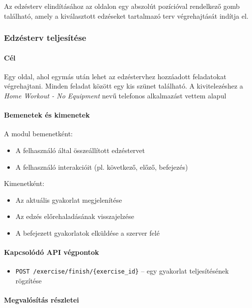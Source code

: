 \documentclass[
]{thesis-ekf}
\theoremstyle{definition}
\theoremstyle{remark}
\begin{document}
Az edzésterv elindításához az oldalon egy abszolút pozícióval rendelkező gomb található, amely a kiválasztott edzéseket tartalmazó terv végrehajtását indítja el.

\subsubsection{Edzésterv teljesítése}

\paragraph{Cél}
Egy oldal, ahol egymás után lehet az edzéstervhez hozzáadott feladatokat végrehajtani. Minden feladat között egy kis szünet található. A kivitelezéshez a \emph{Home Workout - No Equipment} nevű telefonos alkalmazást vettem alapul~\cite{home_workout}

\paragraph{Bemenetek és kimenetek}
A modul bemenetként:
\begin{itemize}
    \item A felhasználó által összeállított edzéstervet
    \item A felhasználó interakcióit (pl. következő, előző, befejezés)
\end{itemize}

Kimenetként:
\begin{itemize}
    \item Az aktuális gyakorlat megjelenítése
    \item Az edzés előrehaladásának visszajelzése
    \item A befejezett gyakorlatok elküldése a szerver felé
\end{itemize}

\paragraph{Kapcsolódó API végpontok}

\begin{itemize}
    \item \texttt{POST /exercise/finish/\{exercise\_id\}} – egy gyakorlat teljesítésének rögzítése
\end{itemize}

\paragraph{Megvalósítás részletei}
\end{document}

